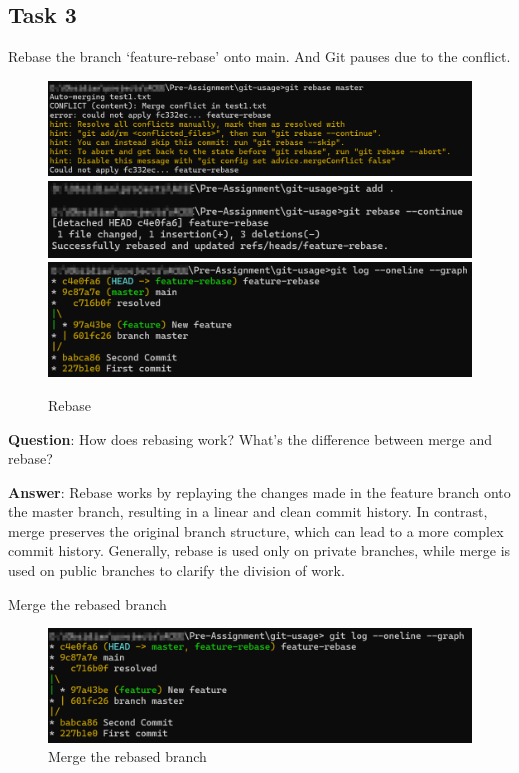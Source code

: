\documentclass{article}
\begin{document}
\subsection{Task 3}
Rebase the branch `feature-rebase' onto main. And Git pauses due to the conflict.
\begin{figure}[H]
    \centering
    \includegraphics[width = \textwidth]{../figures/rebase-abort.png}
    \includegraphics[width = \textwidth]{../figures/rebase-continue.png}
    \includegraphics[width = \textwidth]{../figures/rebase-history.png}
    \caption{Rebase}
\end{figure}

\textbf{Question}: How does rebasing work? What’s the difference between merge and rebase?

\textbf{Answer}: Rebase works by replaying the changes made in the feature branch onto the master branch, resulting in a linear and clean commit history. In contrast, merge preserves the original branch structure, which can lead to a more complex commit history. Generally, rebase is used only on private branches,
while merge is used on public branches to clarify the division of work.

Merge the rebased branch
\begin{figure}[H]
    \centering
    \includegraphics[width = \textwidth]{../figures/fast-forward-merge.png}
    \caption{Merge the rebased branch}
\end{figure}
\end{document}
